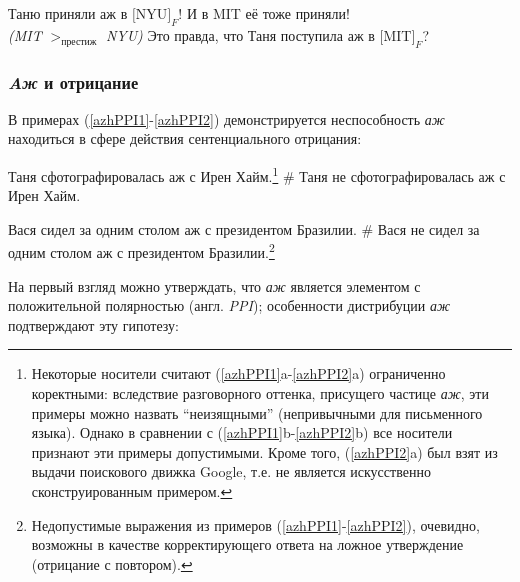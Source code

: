 \documentclass[a4paper, titlepage, 14pt]{article}
\begin{document}
\begin{exe}
    \ex \begin{xlist}
        \ex Таню приняли аж в $[$\textsc{NYU}$]_F$! И в MIT её тоже приняли!\\
        \textit{(MIT} $ >_{\text{престиж}} $ \textit{NYU)}
        \ex Это правда, что Таня поступила аж в $[$\textsc{MIT}$]_F$?
    \end{xlist}
\end{exe}

\subsubsection{\textit{Aж} и отрицание}

В примерах (\ref{azhPPI1}-\ref{azhPPI2}) демонстрируется неспособность \textit{аж} находиться в сфере действия сентенциального отрицания:

\begin{exe}
    \ex \label{azhPPI1} \begin{xlist}
        \ex Таня сфотографировалась аж с Ирен Хайм.\footnote{Некоторые носители считают (\ref{azhPPI1}a-\ref{azhPPI2}a) ограниченно коректными: вследствие разговорного оттенка, присущего частице \textit{аж}, эти примеры можно назвать ``неизящными'' (непривычными для письменного языка). Однако в сравнении с (\ref{azhPPI1}b-\ref{azhPPI2}b) все носители признают эти примеры допустимыми. Кроме того, (\ref{azhPPI2}a) был взят из выдачи поискового движка Google, т.е. не является искусственно сконструированным примером.}
        \ex \# Таня не сфотографировалась аж с Ирен Хайм.
    \end{xlist}
\end{exe}

\begin{exe}
    \ex \label{azhPPI2} \begin{xlist}
        \ex Вася сидел за одним столом аж с президентом Бразилии.
        \ex \# Вася не сидел за одним столом аж с президентом Бразилии.\footnote{Недопустимые выражения из примеров (\ref{azhPPI1}-\ref{azhPPI2}), очевидно, возможны в качестве корректирующего ответа на ложное утверждение (отрицание с повтором).}
    \end{xlist}
\end{exe}

\medskip

На первый взгляд можно утверждать, что \textit{аж} является элементом с положительной полярностью (англ. \textit{PPI}); особенности дистрибуции \textit{аж} подтверждают эту гипотезу:
\end{document}
